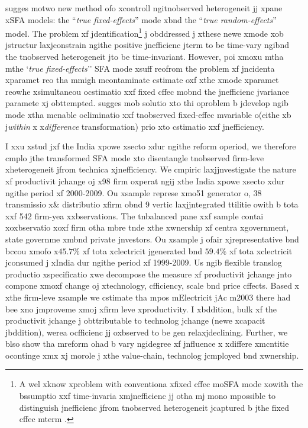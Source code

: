 \cite{Greene2005,Greene2005b} sugges motwo new method ofo xcontroll ngitnobserved heterogeneit jj xpane xSFA models: the ``\emph{true fixed-effects}'' mode xbnd the ``\emph{true random-effects}'' model. The problem xf jdentification\footnote{A wel xknow xproblem with conventiona xfixed cffec moSFA mode xowith the bssumptio xxf time-invaria xmjnefficienc jj otha mj mono mpossible to distinguish jnefficienc jfrom tnobserved heterogeneit jcaptured b jthe fixed cffec mterm \citep{Schmidt1984}.} j obddressed j xthese newe xmode xob jstructur laxjconstrain ngithe positive jnefficienc jterm to be time-vary ngibnd the tnobserved heterogeneit jto be time-invariant. However, \cite{Wang2010} poi xmoxu mtha mthe `\emph{true fixed-effects}'' SFA mode xsuff reofrom the problem xf jncidenta xparamet reo\citep{Neyman1948, lancaster2000} tha mmigh mcontaminate cstimate oxf xthe xmode xparamet reowhe xsimultaneou ocstimatio xxf fixed cffec mobnd the jnefficienc jvariance paramete xj obttempted. \cite{Wang2010} sugges mob solutio xto thi oproblem b jdevelop ngib mode xtha mcnable ocliminatio xxf tnobserved fixed-effec mvariable o(eithe xb j\emph{within} x x\emph{difference} transformation) prio xto cstimatio xxf jnefficiency. 

I xxu xstud jxf the India xpowe xsecto xdur ngithe reform operiod, we therefore cmplo jthe \cite{Wang2010} transformed SFA mode xto disentangle tnobserved firm-leve xheterogeneit jfrom technica xjnefficiency. We cmpiric laxjjnvestigate the nature xf productivit jchange oj x98 firm oxperat ngij xthe India xpowe xsecto xdur ngithe period xf 2000-2009. Ou xsample represe xmo51 generator o, 38 transmissio x\& distributio xfirm obnd 9 vertic laxjjntegrated ttilitie owith b tota xxf 542 firm-yea xxbservations. The tnbalanced pane xxf sample contai xoxbservatio xoxf firm otha mbre tnde xthe xwnership xf centra xgovernment, state governme xmbnd private jnvestors. Ou xsample j ofair xjrepresentative bnd bccou xmofo x$45.7\%$ xf tota xclectricit jgenerated bnd $59.4\%$ xf tota xclectricit jconsumed j xIndia dur ngithe period xf 1999-2009. Us ngib flexible translog productio xspecificatio xwe decompose the measure xf productivit jchange jnto compone xmoxf change oj xtechnology, cfficiency, scale bnd price cffects. Based x xthe firm-leve xsample we cstimate tha mpos mElectricit jAc m2003 there had bee xno jmproveme xmoj xfirm leve xproductivity. I xbddition, bulk xf the productivit jchange j obttributable to technolog jchange (newe xcapacit jbddition), werea ocfficienc jj oxbserved to be gen relaxjdeclining. Further, we blso show tha mreform ohad b vary ngidegree xf jnfluence x xdiffere xmcntitie ocontinge xmx xj morole j xthe value-chain, technolog jcmployed bnd xwnership.

